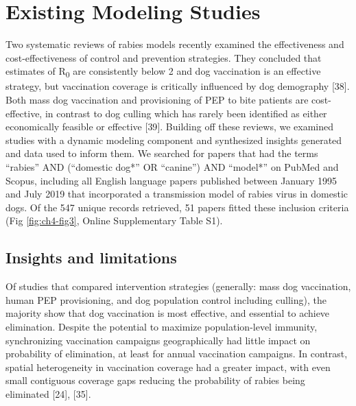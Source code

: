 \documentclass[
  oneside]{book}
\begin{document}
\hypertarget{existing-modeling-studies}{%
\section{Existing Modeling Studies}\label{existing-modeling-studies}}

Two systematic reviews of rabies models recently examined the
effectiveness and cost-effectiveness of control and prevention
strategies. They concluded that estimates of R\textsubscript{0} are consistently below
2 and dog vaccination is an effective strategy, but vaccination coverage
is critically influenced by dog demography {[}38{]}. Both mass dog
vaccination and provisioning of PEP to bite patients are cost-effective,
in contrast to dog culling which has rarely been identified as either
economically feasible or effective {[}39{]}. Building off these reviews,
we examined studies with a dynamic modeling component and synthesized
insights generated and data used to inform them. We searched for papers
that had the terms ``rabies'' AND (``domestic dog*'' OR ``canine'') AND
``model*'' on PubMed and Scopus, including all English language papers
published between January 1995 and July 2019 that incorporated a
transmission model of rabies virus in domestic dogs. Of the 547 unique
records retrieved, 51 papers fitted these inclusion criteria (Fig
\ref{fig:ch4-fig3}, Online Supplementary Table S1).

\hypertarget{insights-and-limitations}{%
\subsection{Insights and limitations}\label{insights-and-limitations}}

Of studies that compared intervention strategies (generally: mass dog
vaccination, human PEP provisioning, and dog population control
including culling), the majority show that dog vaccination is most
effective, and essential to achieve elimination. Despite the potential
to maximize population-level immunity, synchronizing vaccination
campaigns geographically had little impact on probability of
elimination, at least for annual vaccination campaigns. In contrast,
spatial heterogeneity in vaccination coverage had a greater impact, with
even small contiguous coverage gaps reducing the probability of rabies
being eliminated {[}24{]}, {[}35{]}.
\end{document}

